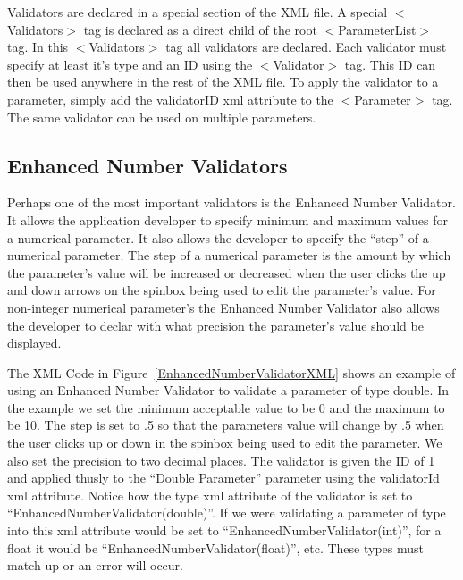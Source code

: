 Validators are declared in a special section of the XML file. A special $<$Validators$>$ tag is declared as a direct child
of the root $<$ParameterList$>$ tag. In this $<$Validators$>$ tag all validators are declared. Each validator must specify at
least it's type and an ID using the $<$Validator$>$ tag. This ID can then be used anywhere in the rest of the XML file. 
To apply the validator to a parameter, simply add the validatorID xml attribute to the $<$Parameter$>$ tag. The same validator 
can be used on multiple parameters.

\subsection{Enhanced Number Validators}
Perhaps one of the most important validators is the Enhanced Number Validator. It allows the application developer
to specify minimum and maximum values for a numerical parameter. It also allows the developer to specify the
``step'' of a numerical parameter. The step of a numerical parameter is the amount by which the parameter's value
will be increased or decreased when the user clicks the up and down arrows on the spinbox being used to edit
the parameter's value. For non-integer numerical parameter's the Enhanced Number Validator also allows the
developer to declar with what precision the parameter's value should be displayed.

The XML Code in Figure~\ref{EnhancedNumberValidatorXML} shows an example of using an Enhanced Number Validator
to validate a parameter of type double. In the example we set the minimum acceptable value to be 0 and the 
maximum to be 10. The step is set to .5 so that the parameters value will change by .5 when the user clicks
up or down in the spinbox being used to edit the parameter. We also set the precision to two decimal places.
The validator is given the ID of 1 and applied thusly to the ``Double Parameter'' parameter using the validatorId
xml attribute. Notice how the type xml attribute of the validator is set to ``EnhancedNumberValidator(double)''. If we 
were validating a parameter of type into this xml attribute would be set to ``EnhancedNumberValidator(int)'', 
for a float it would be ``EnhancedNumberValidator(float)'', etc. These types must match up or an error will
occur.

